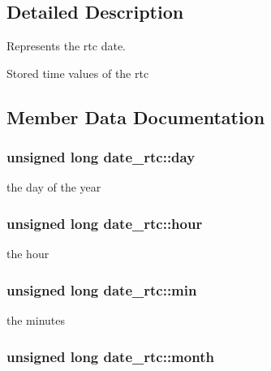 \subsection{Detailed Description}
Represents the rtc date. 

Stored time values of the rtc 

\subsection{Member Data Documentation}
\subsubsection[{\texorpdfstring{day}{day}}]{\setlength{\rightskip}{0pt plus 5cm}unsigned long date\+\_\+rtc\+::day}\hypertarget{structdate__rtc_aafb65ff718f63c0e56aff1168ab3c154}{}\label{structdate__rtc_aafb65ff718f63c0e56aff1168ab3c154}


the day of the year 

\subsubsection[{\texorpdfstring{hour}{hour}}]{\setlength{\rightskip}{0pt plus 5cm}unsigned long date\+\_\+rtc\+::hour}\hypertarget{structdate__rtc_a4a231dccac478c1e2eb419ee34535e0e}{}\label{structdate__rtc_a4a231dccac478c1e2eb419ee34535e0e}


the hour 

\subsubsection[{\texorpdfstring{min}{min}}]{\setlength{\rightskip}{0pt plus 5cm}unsigned long date\+\_\+rtc\+::min}\hypertarget{structdate__rtc_a6ea5d53162f2139e1e2a8d59bd3083b9}{}\label{structdate__rtc_a6ea5d53162f2139e1e2a8d59bd3083b9}


the minutes 

\subsubsection[{\texorpdfstring{month}{month}}]{\setlength{\rightskip}{0pt plus 5cm}unsigned long date\+\_\+rtc\+::month}\hypertarget{structdate__rtc_a12309edd1455518380682d3241cd4b75}{}\label{structdate__rtc_a12309edd1455518380682d3241cd4b75}


